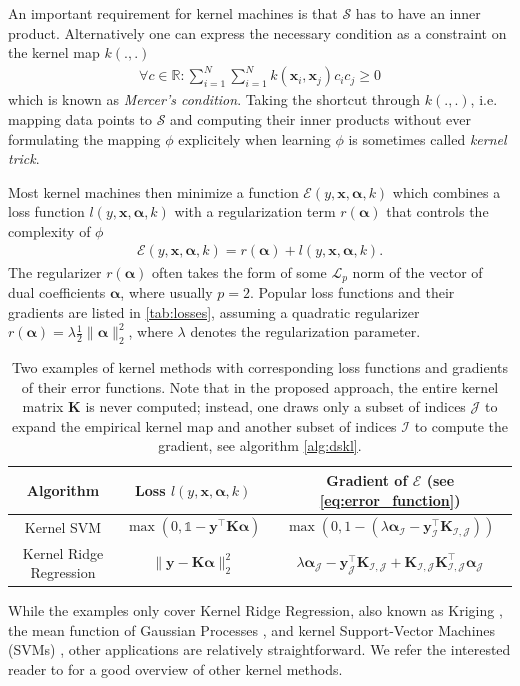 \documentclass{article} %
\newcommand{\ones}{\ensuremath{\mathds{1}}}
\newcommand{\R}{\ensuremath{\mathds{R}}}
\newcommand{\va}{\boldsymbol{\alpha}}
\newcommand{\Bx}{\mathbf{x}}
\renewcommand{\vec}[1]{\mathbf{#1}}
\begin{document}
An important requirement for kernel machines is that $\mathcal{S}$ has to have an inner product. Alternatively one can express the necessary condition as a constraint on the kernel map $k(.,.)$ 
%
\begin{align}\label{eq:kernel_condition}
\forall c\in\R: \sum_{i=1}^N \sum_{i=1}^N k(\Bx_i,\Bx_j)c_ic_j\geq 0
\end{align}
%
which is known as {\em Mercer's condition}.
Taking the shortcut through $k(.,.)$, i.e. mapping data points to $\mathcal{S}$ and computing their inner products without ever formulating the mapping $\phi$ explicitely when learning $\phi$ is sometimes called {\em kernel trick}. 

Most kernel machines then minimize a function $\mathcal{E}(y, \Bx, \va, k)$ which combines a loss function $l(y, \Bx, \va, k)$ with a regularization term $r(\va)$ that controls the complexity of $\phi$ 
%
\begin{align}\label{eq:error_function}
\mathcal{E}(y, \Bx, \va, k) = r(\va) + l(y, \Bx, \va, k).
\end{align}
%
The regularizer $r(\va)$ often takes the form of some $\mathcal{L}_p$ norm of the vector of dual coefficients $\va$, where usually $p=2$. Popular loss functions and their gradients are listed in \autoref{tab:losses}, assuming a quadratic regularizer $r(\va)=\lambda\frac{1}{2}\|\va\|_2^2$, where $\lambda$ denotes the regularization parameter.
%
\begin{table}
\begin{center}
\begin{tabular}{ ccc } 
Algorithm & Loss $l(y, \Bx, \va, k)$ & Gradient of $\mathcal{E}$ (see \autoref{eq:error_function})\\
 \hline
Kernel SVM & $ \max \left(0,\ones-\vec{y}^{\top} \vec{K} \va \right) $& $\max \left(0,1-\left(\lambda\va_{\mathcal{I}} - \vec{y}^{\top}_{\mathcal{I}}\vec{K}_{\mathcal{I,J}}\right)\right)$\\
Kernel Ridge Regression & $ \|\vec{y} - \vec{K}\va \|_2^2 $& $\lambda\va_{\mathcal{J}} - \vec{y}_{\mathcal{J}}^{\top}\vec{K}_{\mathcal{I,J}} + \vec{K}_{\mathcal{I,J}}\vec{K}_{\mathcal{I,J}}^{\top}\va_{\mathcal{J}}$\\
 \hline
\end{tabular}
\caption{Two examples of kernel methods with corresponding loss functions and gradients of their error functions. Note that in the proposed approach, the entire kernel matrix $\vec{K}$ is never computed; instead, one draws only a subset of indices $\mathcal{J}$ to expand the empirical kernel map and another subset of indices $\mathcal{I}$ to compute the gradient, see algorithm \autoref{alg:dskl}. \label{tab:losses}}
\end{center}
\end{table}
%
While the examples only cover Kernel Ridge Regression, also known as Kriging \cite{kriging}, the mean function of Gaussian Processes \cite{RasWil05}, and kernel Support-Vector Machines (SVMs) \cite{Cortes1995}, other applications are relatively straightforward. We refer the interested reader to \cite{learning_with_kernels,shawe2004kernel} for a good overview of other kernel methods. 
\end{document}
